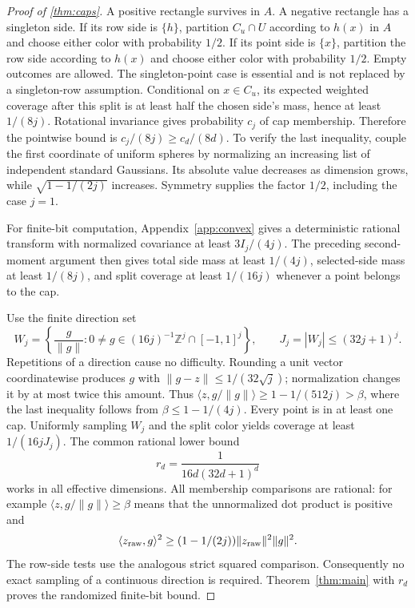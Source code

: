 \begin{proof}[Proof of \cref{thm:caps}]
A positive rectangle survives in $A$. A negative rectangle has a singleton side. If its row side is $\{h\}$, partition $C_u\cap U$ according to $h(x)$ in $A$ and choose either color with probability $1/2$. If its point side is $\{x\}$, partition the row side according to $h(x)$ and choose either color with probability $1/2$. Empty outcomes are allowed. The singleton-point case is essential and is not replaced by a singleton-row assumption. Conditional on $x\in C_u$, its expected weighted coverage after this split is at least half the chosen side's mass, hence at least $1/(8j)$. Rotational invariance gives probability $c_j$ of cap membership. Therefore the pointwise bound is $c_j/(8j)\ge c_d/(8d)$. To verify the last inequality, couple the first coordinate of uniform spheres by normalizing an increasing list of independent standard Gaussians. Its absolute value decreases as dimension grows, while $\sqrt{1-1/(2j)}$ increases. Symmetry supplies the factor $1/2$, including the case $j=1$.

For finite-bit computation, Appendix~\ref{app:convex} gives a deterministic rational transform with normalized covariance at least $3I_j/(4j)$. The preceding second-moment argument then gives total side mass at least $1/(4j)$, selected-side mass at least $1/(8j)$, and split coverage at least $1/(16j)$ whenever a point belongs to the cap.

Use the finite direction set
\[
 W_j=\left\{\frac{g}{\|g\|}:0\ne g\in(16j)^{-1}\mathbb Z^j\cap[-1,1]^j\right\},
 \qquad J_j=|W_j|\le(32j+1)^j.
\]
Repetitions of a direction cause no difficulty. Rounding a unit vector coordinatewise produces $g$ with $\|g-z\|\le1/(32\sqrt j)$; normalization changes it by at most twice this amount. Thus $\langle z,g/\|g\|\rangle\ge1-1/(512j)>\beta$, where the last inequality follows from $\beta\le1-1/(4j)$. Every point is in at least one cap. Uniformly sampling $W_j$ and the split color yields coverage at least $1/(16jJ_j)$. The common rational lower bound
\begin{equation}\label{eq:netr}
 r_d=\frac1{16d(32d+1)^d}
\end{equation}
works in all effective dimensions. All membership comparisons are rational: for example $\langle z,g/\|g\|\rangle\ge\beta$ means that the unnormalized dot product is positive and
\[
 \langle z_{\rm raw},g\rangle^2\ge(1-1/(2j))\|z_{\rm raw}\|^2\|g\|^2.
\] The row-side tests use the analogous strict squared comparison. Consequently no exact sampling of a continuous direction is required. Theorem~\ref{thm:main} with $r_d$ proves the randomized finite-bit bound.


\end{proof}
